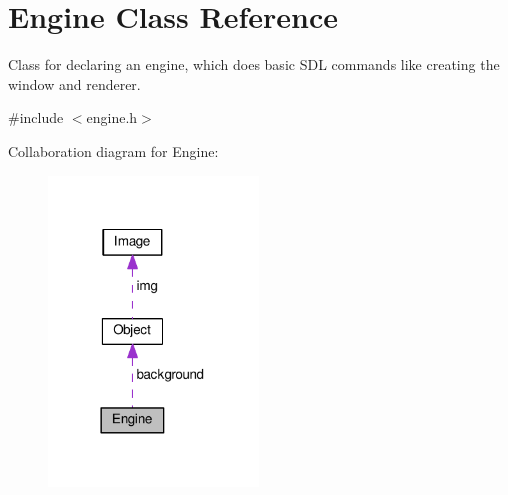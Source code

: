 \hypertarget{classEngine}{}\section{Engine Class Reference}
\label{classEngine}


Class for declaring an engine, which does basic S\+DL commands like creating the window and renderer.  




{\ttfamily \#include $<$engine.\+h$>$}



Collaboration diagram for Engine\+:\nopagebreak
\begin{figure}[H]
\begin{center}
\leavevmode
\includegraphics[width=158pt]{classEngine__coll__graph}
\end{center}
\end{figure}
